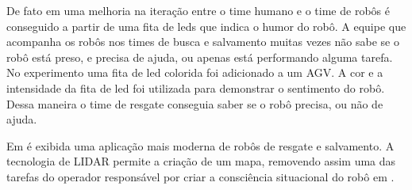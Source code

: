 \documentclass[
	article,			%
	10pt,				%
	oneside,			%
	a4paper,			%
	english,			%
	brazil,				%
	sumario=tradicional	
	]{abntex2}
\begin{document}


De fato em \cite{akgun2022using} uma melhoria na iteração entre o time humano e o time de robôs é conseguido a partir de uma fita de leds que indica o humor do robô. A equipe que acompanha os robôs nos times de busca e salvamento muitas vezes não sabe se o robô está preso, e precisa de ajuda, ou apenas está performando alguma tarefa. No experimento uma fita de led colorida foi adicionado a um AGV. A cor e a intensidade da fita de led foi utilizada para demonstrar o sentimento do robô. Dessa maneira o time de resgate conseguia saber se o robô precisa, ou não de ajuda.


Em \cite{tardioli2016} é exibida uma aplicação mais moderna de robôs de resgate e salvamento. A tecnologia de LIDAR permite a criação de um mapa, removendo assim uma das tarefas do operador responsável por criar a consciência situacional do robô em \cite{Robin2004}. 

\end{document}
